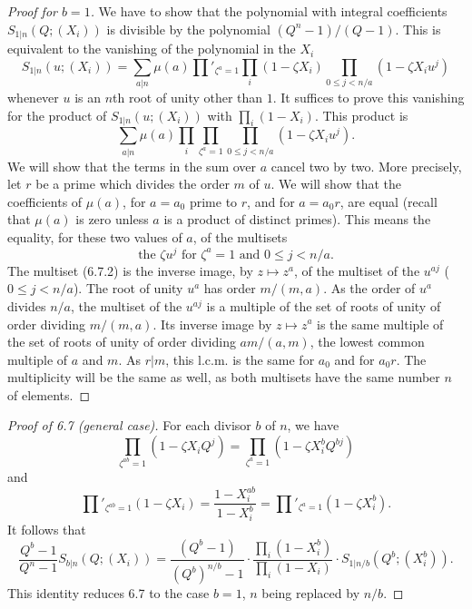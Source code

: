 \documentclass[11pt,a4paper]{article}
\theoremstyle{plain}
\theoremstyle{definition}
\begin{document}
\begin{proof}[Proof for $b=1$]
We have to show that the polynomial with integral coefficients $S_{1|n}(Q; (X_i))$ is divisible by the polynomial $(Q^n - 1)/(Q - 1)$. This is equivalent to the vanishing of the polynomial in the $X_i$
\[
S_{1|n}(u; (X_i)) = \sum_{a | n} \mu(a) \prod'_{\zeta^a=1} \prod_i (1 - \zeta X_i) \prod_{0 \leq j < n/a} (1 - \zeta X_i u^j)
\]
whenever $u$ is an $n$th root of unity other than $1$. It suffices to prove this vanishing for the product of $S_{1|n}(u; (X_i))$ with $\prod_i (1 - X_i)$. This product is
\begin{equation}
\sum_{a | n} \mu(a) \prod_i \prod_{\zeta^a=1} \prod_{0 \leq j < n/a} (1 - \zeta X_i u^j). \tag{6.7.1}
\end{equation}
We will show that the terms in the sum over $a$ cancel two by two. More precisely, let $r$ be a prime which divides the order $m$ of $u$. We will show that the coefficients of $\mu(a)$, for $a = a_0$ prime to $r$, and for $a = a_0 r$, are equal (recall that $\mu(a)$ is zero unless $a$ is a product of distinct primes). This means the equality, for these two values of $a$, of the multisets
\begin{equation}
\text{the $\zeta u^j$ for $\zeta^a=1$ and $0 \leq j < n/a$}. \tag{6.7.2}
\end{equation}
The multiset (6.7.2) is the inverse image, by $z \mapsto z^a$, of the multiset of the $u^{aj}$ ($0 \leq j < n/a$). The root of unity $u^a$ has order $m/(m,a)$. As the order of $u^a$ divides $n/a$, the multiset of the $u^{aj}$ is a multiple of the set of roots of unity of order dividing $m/(m,a)$. Its inverse image by $z \mapsto z^a$ is the same multiple of the set of roots of unity of order dividing $am/(a,m)$, the lowest common multiple of $a$ and $m$. As $r | m$, this l.c.m. is the same for $a_0$ and for $a_0 r$. The multiplicity will be the same as well, as both multisets have the same number $n$ of elements.
\end{proof}

\begin{proof}[Proof of 6.7 (general case)]
For each divisor $b$ of $n$, we have
\[
\prod_{\zeta^{ab}=1} (1 - \zeta X_i Q^j) = \prod_{\zeta^a=1} (1 - \zeta X_i^b Q^{bj})
\]
and
\[
\prod'_{\zeta^{ab}=1} (1 - \zeta X_i) = \frac{1 - X_i^{ab}}{1 - X_i^b} = \prod'_{\zeta^a=1} (1 - \zeta X_i^b).
\]
It follows that
\[
\frac{Q^b - 1}{Q^n - 1} S_{b|n}(Q; (X_i)) = \frac{(Q^b - 1)}{(Q^b)^{n/b} - 1} \cdot \frac{\prod_i (1 - X_i^b)}{\prod_i (1 - X_i)} \cdot S_{1|n/b}(Q^b; (X_i^b)).
\]
This identity reduces 6.7 to the case $b=1$, $n$ being replaced by $n/b$.
\end{proof}
\end{document}
